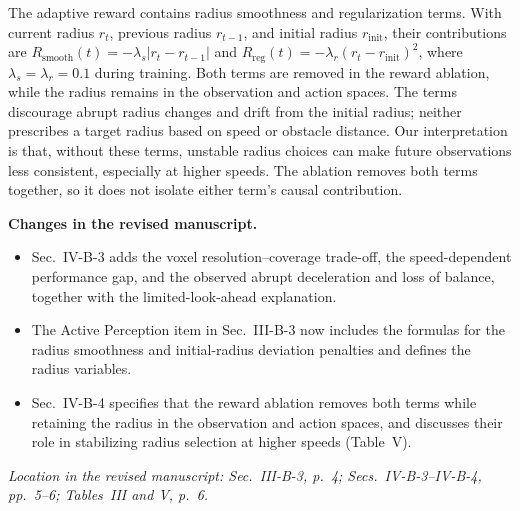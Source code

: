 \documentclass[11pt]{article}
\newcommand{\Changes}{\par\noindent\textbf{Changes in the revised manuscript.}\ }
\newcommand{\Location}[1]{\par\noindent\textit{Location in the revised manuscript: #1}}
\begin{document}
The adaptive reward contains radius smoothness and regularization terms. With current radius $r_t$, previous radius $r_{t-1}$, and initial radius $r_{\mathrm{init}}$, their contributions are $R_{\mathrm{smooth}}(t)=-\lambda_s|r_t-r_{t-1}|$ and $R_{\mathrm{reg}}(t)=-\lambda_r(r_t-r_{\mathrm{init}})^2$, where $\lambda_s=\lambda_r=0.1$ during training. Both terms are removed in the reward ablation, while the radius remains in the observation and action spaces. The terms discourage abrupt radius changes and drift from the initial radius; neither prescribes a target radius based on speed or obstacle distance. Our interpretation is that, without these terms, unstable radius choices can make future observations less consistent, especially at higher speeds. The ablation removes both terms together, so it does not isolate either term's causal contribution.
\Changes
\begin{itemize}
    \item Sec.~IV-B-3 adds the voxel resolution--coverage trade-off, the speed-dependent performance gap, and the observed abrupt deceleration and loss of balance, together with the limited-look-ahead explanation.
    \item The Active Perception item in Sec.~III-B-3 now includes the formulas for the radius smoothness and initial-radius deviation penalties and defines the radius variables.
    \item Sec.~IV-B-4 specifies that the reward ablation removes both terms while retaining the radius in the observation and action spaces, and discusses their role in stabilizing radius selection at higher speeds (Table~V).
\end{itemize}
\Location{Sec.~III-B-3, p.~4; Secs.~IV-B-3--IV-B-4, pp.~5--6; Tables~III and V, p.~6.}
\end{document}
